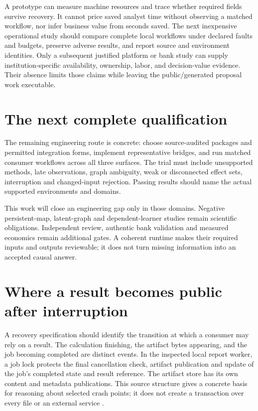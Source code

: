 A prototype can measure machine resources and trace whether required fields
survive recovery. It cannot price saved analyst time without observing a
matched workflow, nor infer business value from seconds saved. The next
inexpensive operational study should compare complete local workflows under
declared faults and budgets, preserve adverse results, and report source and
environment identities. Only a subsequent justified platform or bank study
can supply institution-specific availability, ownership, labor, and
decision-value evidence. Their absence limits those claims while leaving
the public/generated proposal work executable.

\section{The next complete qualification}

The remaining engineering route is concrete: choose source-audited packages
and permitted integration forms, implement representative bridges, and run
matched consumer workflows across all three surfaces. The trial must include
unsupported methods, late observations, graph ambiguity, weak or disconnected
effect sets, interruption and changed-input rejection. Passing results should
name the actual supported environments and domains.

This work will close an engineering gap only in those domains. Negative
persistent-map, latent-graph and dependent-learner studies remain scientific
obligations. Independent review, authentic bank validation and measured
economics remain additional gates. A coherent runtime makes their required
inputs and outputs reviewable; it does not turn missing information into an
accepted causal answer.

\label{exec13:operations-end}


\section{Where a result becomes public after interruption}
\label{exec17:i4-publication}

A recovery specification should identify the transition at which a consumer
may rely on a result. The calculation finishing, the artifact bytes appearing,
and the job becoming completed are distinct events. In the inspected local
report worker, a job lock protects the final cancellation check, artifact
publication and update of the job's completed state and result reference.
The artifact store has its own content and metadata publications. This
source structure gives a concrete basis for reasoning about selected crash
points; it does not create a transaction over every file or an external
service \citep{exec13_ops_source}.

